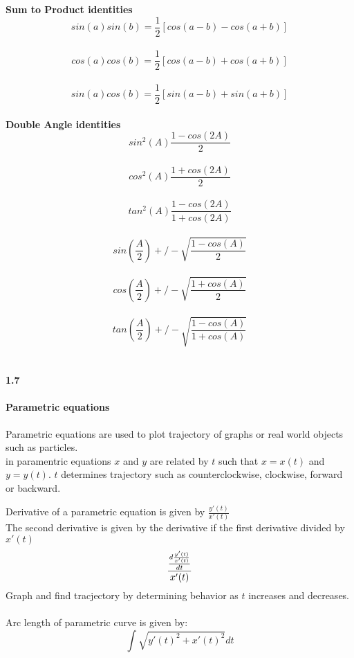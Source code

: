 \documentclass[14pt]{extreport}
\begin{document}
\textbf{Sum to Product identities}\\
$$sin(a)sin(b) = \frac{1}{2}[cos(a-b) - cos(a+b)]$$\\

$$cos(a)cos(b) = \frac{1}{2}[cos(a-b) + cos(a+b)]$$\\

$$sin(a)cos(b) = \frac{1}{2}[sin(a-b) + sin(a+b)]$$\\

\textbf{Double Angle identities}\\

$$sin^2(A) \frac{1-cos(2A)}{2}$$\\

$$cos^2(A) \frac{1+cos(2A)}{2}$$\\

$$tan^2(A) \frac{1-cos(2A)}{1+cos(2A)}$$\\

$$sin(\frac{A}{2}) +/- \sqrt{\frac{1-cos(A)}{2}}$$\\

$$cos(\frac{A}{2}) +/- \sqrt{\frac{1+cos(A)}{2}}$$\\

$$tan(\frac{A}{2}) +/- \sqrt{\frac{1-cos(A)}{1+cos(A)}}$$\\

\paragraph{1.7}\textbf{Parametric equations}\\\\

Parametric equations are used to plot trajectory of graphs or real world objects such as particles.\\
in paramentric equations $x$ and $y$ are related by $t$ such that $x = x(t)$ and $y=y(t)$. $t$ determines trajectory such as counterclockwise, clockwise, forward or backward.

Derivative of a parametric equation is given by $\frac{y'(t)}{x'(t)}$\\
The second derivative is given by the derivative if the first derivative divided by $x'(t)$\\
$$ \frac{\frac{d\frac{y'(t)}{x'(t)}}{dt}}{x'(t)}\\$$
Graph and find tracjectory by determining behavior as $t$ increases and decreases.\\\\
 
Arc length of parametric curve is given by:\\
$$ \int \sqrt{y'(t)^2 + x'(t)^2} dt$$ \\\\
\end{document}

